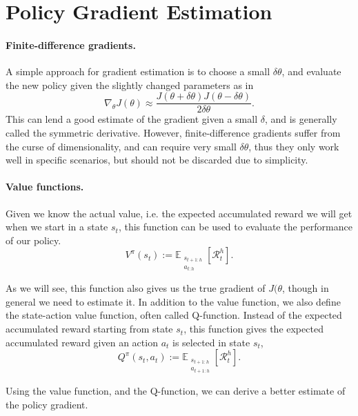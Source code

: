 \section{Policy Gradient Estimation}
\label{sec:pge}

\paragraph{Finite-difference gradients.} 
A simple approach for gradient estimation is to choose a small $\delta\theta$, and evaluate the new policy given the slightly changed parameters as in 
\begin{equation}
	\nabla_\theta J(\theta) \approx \frac{J(\theta+\delta\theta)J(\theta-\delta\theta)}{2\delta\theta}.
\end{equation} 
This can lend a good estimate of the gradient given a small $\delta$, and is generally called the symmetric derivative. 
However, finite-difference gradients suffer from the curse of dimensionality, and can require very small $\delta\theta$, thus they only work well in specific scenarios, but should not be discarded due to simplicity. 

\paragraph{Value functions.} 
Given we know the actual value, i.e. the expected accumulated reward we will get when we start in a state $s_t$, this function can be used to evaluate the performance of our policy.
\begin{equation}
	V^{\pi}(s_t) := \mathbb{E}_{\substack{s_{t+1:h} \\ a_{t:h}}}\left[\mathcal{R}_t^h\right].
	\label{eqn:v}
\end{equation}

As we will see, this function also gives us the true gradient of $J(\theta$, though in general we need to estimate it. 
In addition to the value function, we also define the state-action value function, often called Q-function. 
Instead of the expected accumulated reward starting from state $s_t$, this function gives the expected accumulated reward given an action $a_t$ is selected in state $s_t$, 
\begin{equation}
	Q^{\pi}(s_t, a_t) := \mathbb{E}_{\substack{s_{t+1:h} \\ a_{t+1:h}}}\left[\mathcal{R}_t^h\right].
	\label{eqn:q}
\end{equation}

Using the value function, and the Q-function, we can derive a better estimate of the policy gradient.

